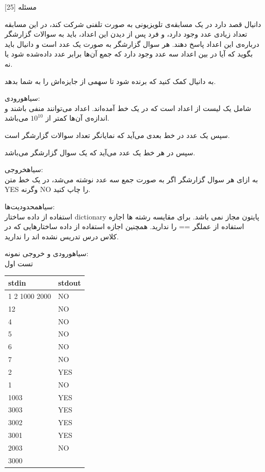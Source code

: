 ‌مسئله [25]

دانیال قصد دارد در یک مسابقه‌ی تلویزیونی به صورت تلفنی  شرکت کند، در این مسابقه تعداد زیادی عدد وجود دارد، و فرد پس از دیدن این اعداد، باید به سوالات گزارشگر درباره‌ی این اعداد پاسخ دهند. هر سوال گزارشگر به صورت یک عدد است و دانیال باید بگوید که آیا در بین اعداد سه عدد وجود دارد که جمع آن‌ها برابر عدد داده‌شده شود یا نه.
 
 به دانیال کمک کنید که برنده شود تا سهمی از جایزه‌اش را به شما بدهد.

‌سیاه{ورودی:}\\
شامل یک لیست از اعداد است که در یک خط آمده‌اند. اعداد می‌توانند منفی باشند و اندازه‌ی آن‌ها کمتر از
$10^10$
می‌باشد.

سپس یک عدد در خط بعدی می‌آید که نمایانگر تعداد سوالات گزارشگر است.

سپس در هر خط یک عدد می‌آید که یک سوال گزارشگر می‌باشد.

‌سیاه{خروجی:}\\
به ازای هر سوال گزارشگر اگر به صورت جمع سه عدد نوشته می‌شد، در یک خط متن YES وگرنه NO را چاپ کنید.

‌سیاه{محدودیت‌ها:}\\
استفاده از داده ساختار dictionary پایتون مجاز نمی باشد. برای مقایسه رشته ها اجازه استفاده از عملگر == را ندارید. همچنین اجازه استفاده از داده ساختارهایی که در کلاس درس تدریس نشده اند را ندارید.

‌سیاه{ورودی و خروجی نمونه:}\\

تست اول
\begin{latin}
	\begin{tabularx}{\textwidth}{|X | X|}
		\hline
		\textbf{stdin} &
		\textbf{stdout}\\
		\hline
		1 2 1000 2000
 & NO\\
		12 & NO \\
4 & NO\\
5 & NO \\
6 & NO \\
7 & NO \\
2 & YES \\
1 & NO \\
1003 & YES \\
3003 & YES \\
3002 & YES \\
3001 & YES \\
2003 & NO \\
3000 & \\
		\hline
	\end{tabularx}
\end{latin}


